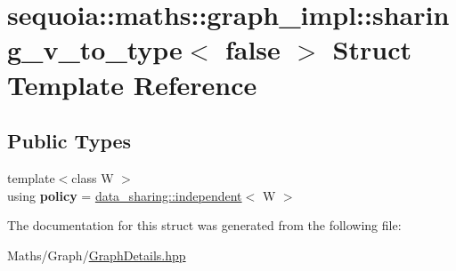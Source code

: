\hypertarget{structsequoia_1_1maths_1_1graph__impl_1_1sharing__v__to__type_3_01false_01_4}{}\section{sequoia\+::maths\+::graph\+\_\+impl\+::sharing\+\_\+v\+\_\+to\+\_\+type$<$ false $>$ Struct Template Reference}
\label{structsequoia_1_1maths_1_1graph__impl_1_1sharing__v__to__type_3_01false_01_4}
\subsection*{Public Types}
\begin{DoxyCompactItemize}
\item 
\mbox{\label{structsequoia_1_1maths_1_1graph__impl_1_1sharing__v__to__type_3_01false_01_4_ae1c64a74b5e559f3ef62f3ee97e93a56}} 
{\footnotesize template$<$class W $>$ }\\using {\bfseries policy} = \mbox{\hyperlink{structsequoia_1_1data__sharing_1_1independent}{data\+\_\+sharing\+::independent}}$<$ W $>$
\end{DoxyCompactItemize}


The documentation for this struct was generated from the following file\+:\begin{DoxyCompactItemize}
\item 
Maths/\+Graph/\mbox{\hyperlink{_graph_details_8hpp}{Graph\+Details.\+hpp}}\end{DoxyCompactItemize}
